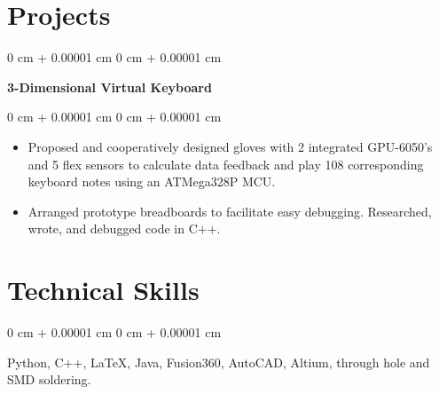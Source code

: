 \documentclass[10pt, letterpaper]{article}
\newenvironment{highlights}{
    \begin{itemize}[
        topsep=0.10 cm,
        parsep=0.10 cm,
        partopsep=0pt,
        itemsep=0pt,
        leftmargin=0 cm + 10pt
    ]
}{
    \end{itemize}
} %
\newenvironment{onecolentry}{
    \begin{adjustwidth}{
        0 cm + 0.00001 cm
    }{
        0 cm + 0.00001 cm
    }
}{
    \end{adjustwidth}
} %
\newenvironment{twocolentry}[2][]{
    \onecolentry
    \def\secondColumn{#2}
    \setcolumnwidth{\fill, 4.5 cm}
    \begin{paracol}{2}
}{
    \switchcolumn \raggedleft \secondColumn
    \end{paracol}
    \endonecolentry
} %
\begin{document}
    
    \section{Projects}



        
        \begin{twocolentry}{
    
        }
            \textbf{3-Dimensional Virtual Keyboard}\end{twocolentry}

        \vspace{0.10 cm}
        \begin{onecolentry}
            \begin{highlights}
                \item Proposed and cooperatively designed gloves with 2 integrated GPU-6050's and 5 flex sensors to calculate data feedback and play
                108 corresponding keyboard notes using an ATMega328P MCU.
                \item Arranged prototype breadboards to facilitate easy debugging. Researched, wrote, and debugged code in C++.
            \end{highlights}
        \end{onecolentry}
    
    \section{Technical Skills}

        \begin{onecolentry}
            \item Python, C++, LaTeX, Java, Fusion360, AutoCAD, Altium, through hole and SMD soldering.
        \end{onecolentry}
\end{document}
